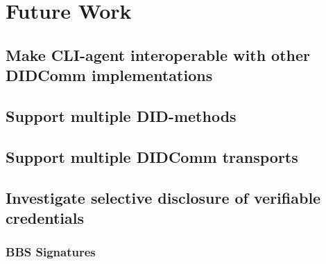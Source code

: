 \chapter{Future Work}

\section{Make CLI-agent interoperable with other DIDComm implementations}

\section{Support multiple DID-methods}

\section{Support multiple DIDComm transports}

\section{Investigate selective disclosure of verifiable credentials}

\subsection{BBS Signatures}
